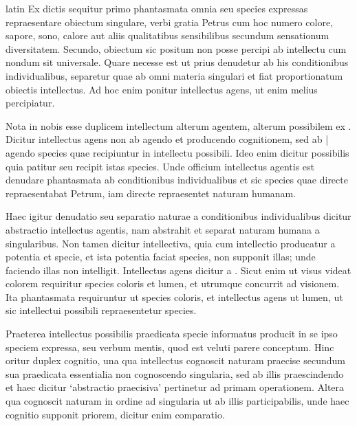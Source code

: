 \begin{otherlanguage*}{latin}
\pstart
  Ex dictis sequitur primo phantasmata omnia seu species expressas repraesentare obiectum singulare, verbi gratia Petrus cum hoc numero colore, sapore, sono, calore aut aliis qualitatibus sensibilibus secundum sensationum diversitatem. Secundo, obiectum sic positum non posse percipi ab intellectu cum nondum sit universale. Quare necesse est ut prius denudetur ab his conditionibus individualibus, separetur quae ab omni materia singulari et fiat proportionatum obiectis intellectus. Ad hoc enim ponitur intellectus agens, ut enim melius percipiatur. 
\pend

\pstart
  Nota in nobis esse duplicem intellectum alterum agentem, alterum possibilem ex . Dicitur intellectus agens non ab agendo et producendo cognitionem, sed ab \textnormal{|}   agendo species quae recipiuntur in intellectu possibili. Ideo enim dicitur possibilis quia patitur seu recipit istas species. Unde officium intellectus agentis est denudare phantasmata ab conditionibus individualibus et sic species quae directe repraesentabat Petrum, iam directe repraesentet naturam humanam. 
\pend

\pstart
  Haec igitur denudatio seu separatio naturae a conditionibus individualibus dicitur abstractio intellectus agentis, nam abstrahit et separat naturam humana a singularibus. Non tamen dicitur intellectiva, quia cum intellectio producatur a potentia et specie, et ista potentia faciat species, non supponit illas; unde faciendo illas non intelligit. Intellectus agens dicitur a . Sicut enim ut visus videat colorem requiritur species coloris et lumen, et utrumque concurrit ad visionem. Ita phantasmata requiruntur ut species coloris, et intellectus agens ut lumen, ut sic intellectui possibili repraesentetur species. 
\pend

\pstart
  Praeterea intellectus possibilis praedicata specie informatus producit in se ipso speciem expressa, seu verbum mentis, quod est veluti parere conceptum. Hinc oritur duplex cognitio, una qua intellectus cognoscit naturam praecise secundum sua praedicata essentialia non cognoscendo singularia, sed ab illis praescindendo et haec dicitur `abstractio praecisiva' pertinetur ad primam operationem. Altera qua cognoscit naturam in ordine ad singularia ut ab illis participabilis, unde haec cognitio supponit priorem, dicitur enim comparatio. 
\pend


\end{otherlanguage*}
